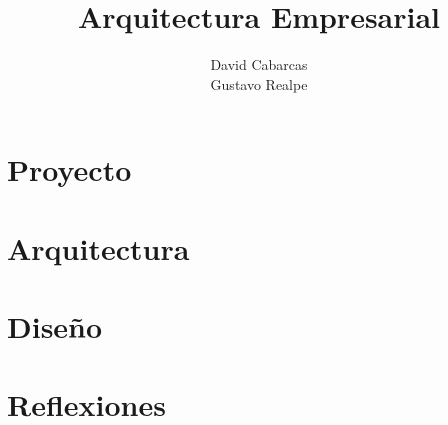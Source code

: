 \documentclass[12pt]{book}
\title{Arquitectura Empresarial}
\author{David Cabarcas \\ Gustavo Realpe}
\begin{document}
\maketitle
\tableofcontents
\listoffigures
\part{Proyecto}

%
\part{Arquitectura}






\part{Diseño}



\part{Reflexiones}

\end{document}
